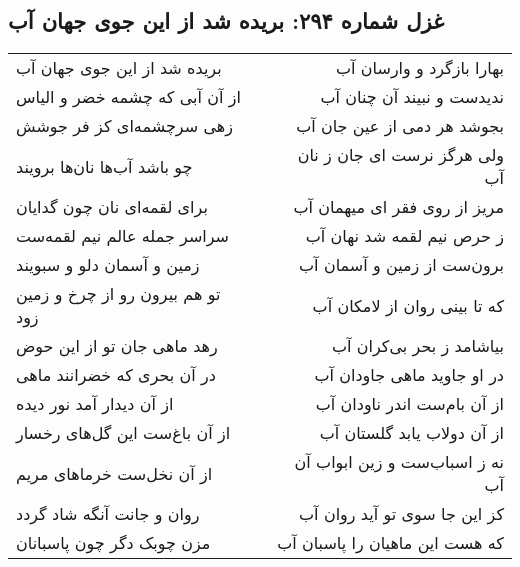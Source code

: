 \begin{center}
\section*{غزل شماره ۲۹۴: بریده شد از این جوی جهان آب}
\label{sec:0294}
\begin{longtable}{l p{0.5cm} r}
بریده شد از این جوی جهان آب
&&
بهارا بازگرد و وارسان آب
\\
از آن آبی که چشمه خضر و الیاس
&&
ندیدست و نبیند آن چنان آب
\\
زهی سرچشمه‌ای کز فر جوشش
&&
بجوشد هر دمی از عین جان آب
\\
چو باشد آب‌ها نان‌ها برویند
&&
ولی هرگز نرست ای جان ز نان آب
\\
برای لقمه‌ای نان چون گدایان
&&
مریز از روی فقر ای میهمان آب
\\
سراسر جمله عالم نیم لقمه‌ست
&&
ز حرص نیم لقمه شد نهان آب
\\
زمین و آسمان دلو و سبویند
&&
برون‌ست از زمین و آسمان آب
\\
تو هم بیرون رو از چرخ و زمین زود
&&
که تا بینی روان از لامکان آب
\\
رهد ماهی جان تو از این حوض
&&
بیاشامد ز بحر بی‌کران آب
\\
در آن بحری که خضرانند ماهی
&&
در او جاوید ماهی جاودان آب
\\
از آن دیدار آمد نور دیده
&&
از آن بام‌ست اندر ناودان آب
\\
از آن باغ‌ست این گل‌های رخسار
&&
از آن دولاب یابد گلستان آب
\\
از آن نخل‌ست خرماهای مریم
&&
نه ز اسباب‌ست و زین ابواب آن آب
\\
روان و جانت آنگه شاد گردد
&&
کز این جا سوی تو آید روان آب
\\
مزن چوبک دگر چون پاسبانان
&&
که هست این ماهیان را پاسبان آب
\\
\end{longtable}
\end{center}
